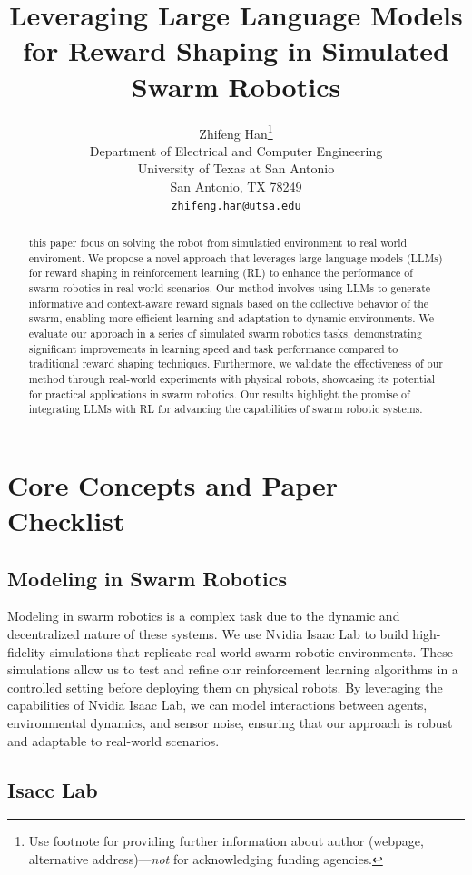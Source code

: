 \documentclass{article}
\title{Leveraging Large Language Models for Reward Shaping in Simulated Swarm Robotics}
\author{
  Zhifeng Han\thanks{Use footnote for providing further information
    about author (webpage, alternative address)---\emph{not} for acknowledging
    funding agencies.} \\
  Department of Electrical and Computer Engineering\\
  University of Texas at San Antonio\\
  San Antonio, TX 78249 \\
  \texttt{zhifeng.han@utsa.edu} \\
}
\begin{document}
\maketitle
\makeatother


\begin{abstract}
  this paper focus on solving the robot from simulatied environment to real world enviroment. We propose a novel approach that leverages large language models (LLMs) for reward shaping in reinforcement learning (RL) to enhance the performance of swarm robotics in real-world scenarios. Our method involves using LLMs to generate informative and context-aware reward signals based on the collective behavior of the swarm, enabling more efficient learning and adaptation to dynamic environments. We evaluate our approach in a series of simulated swarm robotics tasks, demonstrating significant improvements in learning speed and task performance compared to traditional reward shaping techniques. Furthermore, we validate the effectiveness of our method through real-world experiments with physical robots, showcasing its potential for practical applications in swarm robotics. Our results highlight the promise of integrating LLMs with RL for advancing the capabilities of swarm robotic systems.
\end{abstract}


\section{Core Concepts and Paper Checklist}


\subsection{Modeling in Swarm Robotics}

Modeling in swarm robotics is a complex task due to the dynamic and decentralized nature of these systems. We use Nvidia Isaac Lab to build high-fidelity simulations that replicate real-world swarm robotic environments. These simulations allow us to test and refine our reinforcement learning algorithms in a controlled setting before deploying them on physical robots. By leveraging the capabilities of Nvidia Isaac Lab, we can model interactions between agents, environmental dynamics, and sensor noise, ensuring that our approach is robust and adaptable to real-world scenarios.
\subsection{Isacc Lab}
\end{document}
